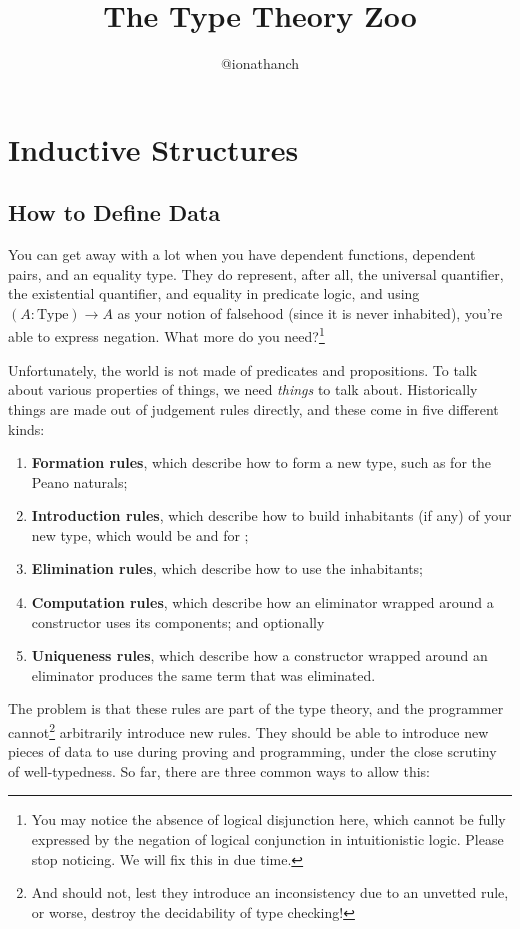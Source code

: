 \documentclass{report}
\title{The Type Theory Zoo}
\author{@ionathanch}
\newcommand{\Nat}{\const{Nat}}
\newcommand{\zero}{\const{zero}}
\newcommand{\const}[1]{\text{#1}}
\newcommand{\Type}{\const{Type}}
\begin{document}
\maketitle
\tableofcontents

\chapter{Inductive Structures}

\section{How to Define Data}

You can get away with a lot when you have dependent functions, dependent pairs, and an equality type. They do represent, after all, the universal quantifier, the existential quantifier, and equality in predicate logic, and using $(A: \Type) \to A$ as your notion of falsehood (since it is never inhabited), you're able to express negation. What more do you need?\footnote{You may notice the absence of logical disjunction here, which cannot be fully expressed by the negation of logical conjunction in intuitionistic logic. Please stop noticing. We will fix this in due time.}

Unfortunately, the world is not made of predicates and propositions. To talk about various properties of things, we need \emph{things} to talk about. Historically things are made out of judgement rules directly, and these come in five different kinds:

\begin{enumerate}
    \item \textbf{Formation rules}, which describe how to form a new type, such as \Nat for the Peano naturals;
    \item \textbf{Introduction rules}, which describe how to build inhabitants (if any) of your new type, which would be \zero and \const{succ} for \Nat;
    \item \textbf{Elimination rules}, which describe how to use the inhabitants;
    \item \textbf{Computation rules}, which describe how an eliminator wrapped around a constructor uses its components; and optionally
    \item \textbf{Uniqueness rules}, which describe how a constructor wrapped around an eliminator produces the same term that was eliminated.
\end{enumerate}

The problem is that these rules are part of the type theory, and the programmer cannot\footnote{And should not, lest they introduce an inconsistency due to an unvetted rule, or worse, destroy the decidability of type checking!} arbitrarily introduce new rules. They should be able to introduce new pieces of data to use during proving and programming, under the close scrutiny of well-typedness. So far, there are three common ways to allow this:
\end{document}
